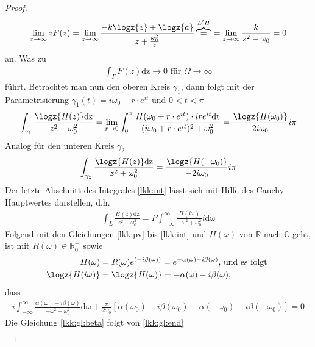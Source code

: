 \begin{satz}
\begin{proof}
\begin{align}
	\lim_{z \rightarrow \infty} z F(z) = \lim_{z \rightarrow \infty} \frac{-k \logz{z} + \logz{a}}{z + \frac{\omega_0^2}{z}} \overbrace{=}^{L'H} = \lim_{z \rightarrow \infty} \frac{k}{z^2-\omega_0} = 0
\end{align}
an. Was zu  
\begin{align}
	 \int_{\Gamma} F(z) \mathrm{dz} \rightarrow 0 \text{ für }\Omega \rightarrow \infty  
\end{align} 
führt. Betrachtet man nun den oberen Kreis $\gamma_1$, dann folgt mit der Parametrisierung $\gamma_1(t) = i\omega_0 + r \cdot e^{i t}$ und $0 < t < \pi$
\begin{align}
	\int_{\gamma_1} \frac{\logz{H(z)}\mathrm{dz}}{z^2+\omega_0^2} = \lim_{r\rightarrow 0} \int_0^{\pi} \frac{H(\omega_0 + r \cdot e^{i t}) \cdot {i r e^{it}} \mathrm{dt}}{(i \omega_0 + r \cdot e^{i t})^2 + \omega_0^2}  = \frac{\logz{H(\omega_0)}}{2 i \omega_0} i \pi 
\end{align}
Analog für den unteren Kreis $\gamma_2$ 
\begin{align}
	\int_{\gamma_2} \frac{\logz{H(z)}\mathrm{dz}}{z^2+\omega_0^2} = \frac{\logz{H(-\omega_0)}}{-2 i \omega_0} i \pi 
\end{align}
Der letzte Abschnitt des Integrales \ref{lkk:int} lässt sich mit Hilfe des Cauchy - Hauptwertes darstellen,
d.h.
\begin{align}
	\int_L \frac{H(z)\mathrm{dz}}{z^2 + \omega_0^2} = P \int_{-\infty}^{\infty} \frac{H(i \omega)}{- \omega^2 + \omega_0^2} i \mathrm{d\omega} \label{lkk:pv}
\end{align}
Folgend mit den Gleichungen \ref{lkk:pv} bis \ref{lkk:int} und $H(\omega)$ von $\mathbb{R}$ nach $\mathbb{C}$ geht, ist mit $R(\omega) \in \mathbb{R}^+_0$ sowie
\begin{align}
	H(\omega) &= R(\omega) e^{(-i\beta(\omega))} = e^{-\alpha(\omega) - i\beta(\omega)} \text{, und es folgt }\\
	\logz{H(i \omega)}	&= \logz{H(\omega)}  = -\alpha(\omega) - i \beta(\omega)\text{, }
\end{align}
dass
\begin{align}
	i \int_{-\infty}^{\infty} \frac{\alpha(\omega) + i \beta(\omega)}{-\omega^2 + \omega_0^2}\mathrm{d\omega} + \frac{\pi}{2\omega_0} \left[ \alpha(\omega_0) + i \beta(\omega_0) - \alpha(-\omega_0) - i \beta(-\omega_0) \right] = 0\label{lkk:gl:end}
\end{align}
Die Gleichung \ref{lkk:gl:beta} folgt von \ref{lkk:gl:end}
\begin{align}

\end{align}
\end{proof}
\end{satz}
